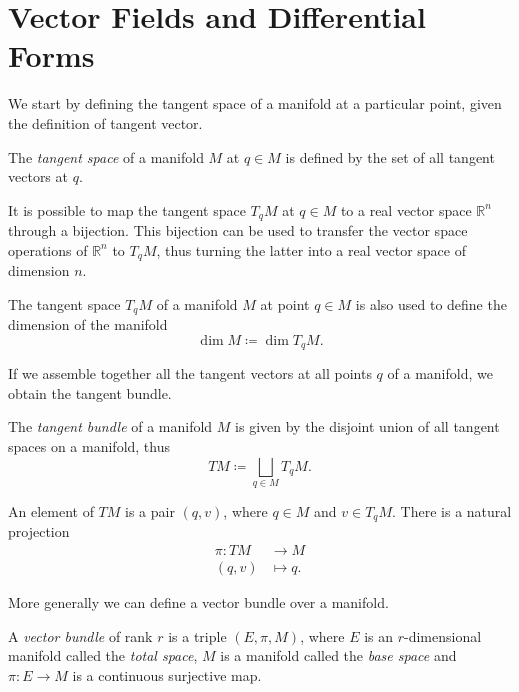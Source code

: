 \section{Vector Fields and Differential Forms}
\label{sec:sec1}

We start by defining the tangent space of a manifold at a particular point, given the definition of tangent vector.

\begin{definition}
    The \emph{tangent space} of a manifold $M$ at $q \in M$ is defined by the set of all tangent vectors at $q$.
\end{definition}

It is possible to map the tangent space $T_q M$ at $q \in M$ to a real vector space $\mathbb{R}^n$ through a bijection.
This bijection can be used to transfer the vector space operations of $\mathbb{R}^n$ to $T_q M$, thus turning the latter into a real vector space of dimension $n$.

The tangent space $T_q M$ of a manifold $M$ at point $q \in M$ is also used to define the dimension of the manifold 
\begin{equation*}
    \dim M \coloneqq \dim T_q M .
\end{equation*}

If we assemble together all the tangent vectors at all points $q$ of a manifold, we obtain the tangent bundle.

\begin{definition}
    The \emph{tangent bundle} of a manifold $M$ is given by the disjoint union of all tangent spaces on a manifold, thus
    \begin{equation*}
        TM \coloneqq \bigsqcup _{q \in M} T_q M .
    \end{equation*}
\end{definition}

An element of $TM$ is a pair $(q, v)$, where $q \in M$ and $v \in T_q M$.
There is a natural projection
\begin{align*}
    \pi : TM &\rightarrow M \\
    (q, v) &\mapsto q .
\end{align*}

More generally we can define a vector bundle over a manifold.
\begin{definition}
    A \emph{vector bundle} of rank $r$ is a triple $(E, \pi, M)$, where $E$ is an $r$-dimensional manifold called the \emph{total space}, $M$ is a manifold called the \emph{base space} and $\pi : E \rightarrow M$ is a continuous surjective map.
\end{definition}

